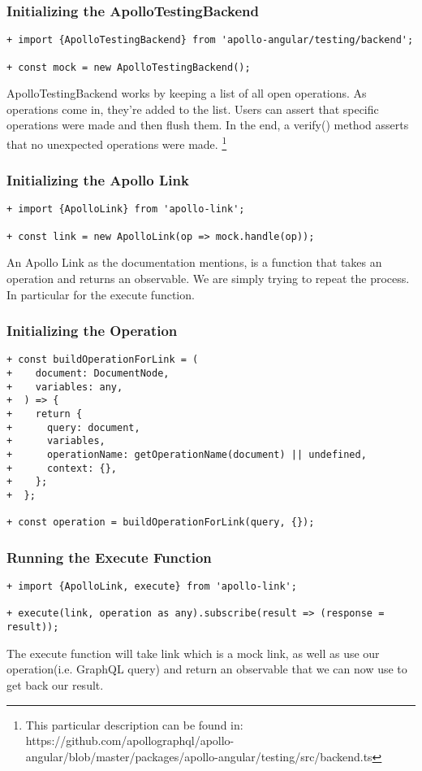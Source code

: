 \subsubsection { Initializing the ApolloTestingBackend }
\begin{lstlisting}
+ import {ApolloTestingBackend} from 'apollo-angular/testing/backend';

+ const mock = new ApolloTestingBackend();
\end{lstlisting}

ApolloTestingBackend works by keeping a list of all open operations.
As operations come in, they're added to the list. Users can assert that specific
operations were made and then flush them. In the end, a verify() method asserts
that no unexpected operations were made.
\footnote{This particular description can be found in: https://github.com/apollographql/apollo-angular/blob/master/packages/apollo-angular/testing/src/backend.ts}

\subsubsection { Initializing the Apollo Link }

\begin{lstlisting}
+ import {ApolloLink} from 'apollo-link';

+ const link = new ApolloLink(op => mock.handle(op));
\end{lstlisting}

An Apollo Link as the documentation mentions, is a function that takes an
operation and returns an observable. We are simply trying to repeat the process.
In particular for the execute function.

\subsubsection { Initializing the Operation }
\begin{lstlisting}
+ const buildOperationForLink = (
+    document: DocumentNode,
+    variables: any,
+  ) => {
+    return {
+      query: document,
+      variables,
+      operationName: getOperationName(document) || undefined,
+      context: {},
+    };
+  };

+ const operation = buildOperationForLink(query, {});
\end{lstlisting}

\subsubsection { Running the Execute Function }
\begin{lstlisting}
+ import {ApolloLink, execute} from 'apollo-link';

+ execute(link, operation as any).subscribe(result => (response = result));
\end{lstlisting}

The execute function will take link which is a mock link, as well as use our
operation(i.e. GraphQL query) and return an observable that we can now use to
get back our result.
